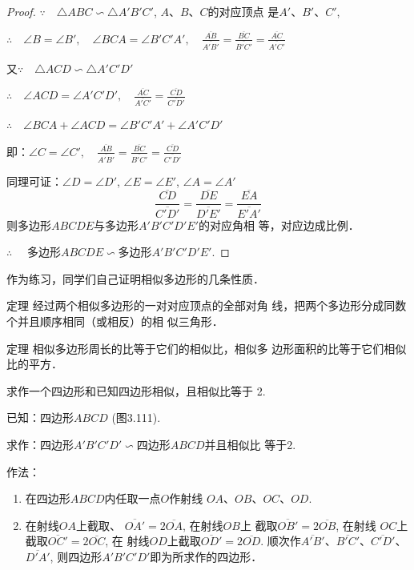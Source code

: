 \begin{proof}
$\because\quad \triangle ABC\backsim \triangle A'B'C'$, $A$、$B$、$C$的对应顶点
是$A'$、$B'$、$C'$,

$\therefore\quad \angle B=\angle B',\quad \angle BCA=\angle B'C'A',\quad  \frac{\overline{AB}}{\overline{A'B'}}=\frac{\overline{BC}}{\overline{B'C'}}=\frac{\overline{AC}}{\overline{A'C'}}$

又$\because\quad \triangle ACD\backsim \triangle A'C'D'$

$\therefore\quad \angle ACD=\angle A'C'D',\quad \frac{\overline{AC}}{\overline{A'C'}}=\frac{\overline{CD}}{\overline{C'D'}}$

$\therefore\quad \angle BCA+\angle ACD=\angle B'C'A'+\angle A'C'D'$

即：$\angle C=\angle C',\quad \frac{\overline{AB}}{\overline{A'B'}}=\frac{\overline{BC}}{\overline{B'C'}}=\frac{\overline{CD}}{\overline{C'D'}}$

同理可证：$\angle D=\angle D'$, $\angle E=\angle E'$, $\angle A=\angle A'$
\[\frac{\overline{CD}}{\overline{C'D'}}=\frac{\overline{DE}}{\overline{D'E'}}=\frac{\overline{EA}}{\overline{E'A'}}\]
则多边形$ABCDE$与多边形$A'B'C'D'E'$的对应角相
等，对应边成比例．

$\therefore\quad$ 多边形$ABCDE\backsim $多边形$A'B'C'D'E'$.
\end{proof}

作为练习，同学们自己证明相似多边形的几条性质．
\begin{blk}
    {定理} 经过两个相似多边形的一对对应顶点的全部对角
线，把两个多边形分成同数个并且顺序相同（或相反）的相
似三角形．
\end{blk}

\begin{blk}
   {定理} 相似多边形周长的比等于它们的相似比，相似多
边形面积的比等于它们相似比的平方． 
\end{blk}

\begin{example}
    求作一个四边形和已知四边形相似，且相似比等于
    2.

    已知：四边形$ABCD$ (图3.111).

    求作：四边形$A'B'C'D'\backsim$四边形$ABCD$并且相似比
等于2.

作法：
\begin{enumerate}
    \item 在四边形$ABCD$内任取一点$O$作射线
$OA$、$OB$、$OC$、$OD$.
\item 在射线$OA$上截取、
$\overline{OA'}=2\overline{OA}$, 在射线$OB$上
截取$\overline{OB'}=2\overline{OB}$, 在射线
$OC$上截取$\overline{OC'}=2\overline{OC}$, 在
射线$OD$上截取$\overline{OD'}=2\overline{OD}$. 
顺次作$\overline{A'B'}$、$\overline{B'C'}$、$\overline{C'D'}$、$\overline{D'A'}$, 
则四边形$A'B'C'D'$即为所求作的四边形．
\end{enumerate}
\end{example}

